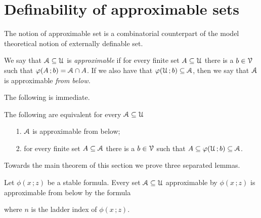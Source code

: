\documentclass[scombinatorics.tex]{subfiles}
\begin{document}
\section{Definability of approximable sets}

The notion of approximable set is a combinatorial counterpart of the model theoretical notion of externally definable set.

\begin{definition}\label{def_approx}
  We say that $\EuScript A\subseteq\EuScript U$ is \emph{approximable\/} if for every finite set $A\subseteq\EuScript U$ there is a $b\in\EuScript V$ such that $\varphi(A\,;b)=\EuScript A\cap A$.
  If we also have that $\varphi(\EuScript U\,;b)\subseteq\EuScript A$, then we say that $\EuScript A$ is approximable \emph{from below.}\QED
\end{definition}

The following is immediate.

\begin{fact}
  The following are equivalent for every $\EuScript A\subseteq\EuScript U$
  \begin{itemize}
    \item[1.] $\EuScript A$ is approximable from below;
    \item[2.] for every finite set $A\subseteq\EuScript A$ there is a $b\in\EuScript V$ such that $A\subseteq\varphi(\EuScript U\,;b)\subseteq\EuScript A$.\QED
  \end{itemize}
\end{fact}

Towards the main theorem of this section we prove three separated lemmas.

\begin{lemma}\label{lem_uno}
  Let $\phi(x\,;z)$ be a stable formula.
  Every set $\EuScript A\subseteq\EuScript U$ approximable by $\phi(x\,;z)$ is approximable from below by the formula

  
  where $n$ is the ladder index of $\phi(x\,;z)$.
\end{lemma}
\end{document}
